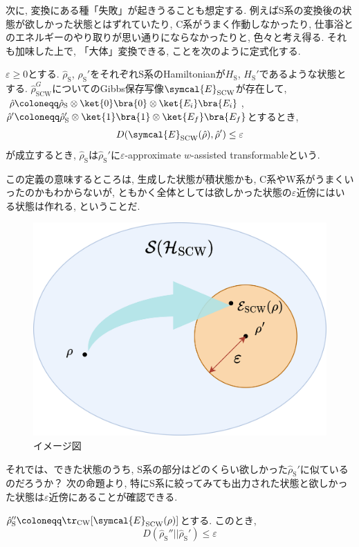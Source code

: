 


次に, 変換にある種「失敗」が起きうることも想定する. 
例えばS系の変換後の状態が欲しかった状態とはずれていたり, C系がうまく作動しなかったり, 仕事浴とのエネルギーのやり取りが思い通りにならなかったりと, 色々と考え得る. 
それも加味した上で, 「大体」変換できる, ことを次のように定式化する. 

\begin{mydfn}\label{dfn.approximate_single-shot_transformable}
  $\varepsilon \geq 0$とする. 
  $\hat{\rho}_{\text{S}}$, $\hat{\rho}_{\text{S}}'$をそれぞれS系のHamiltonianが$H_{\text{S}}$, $H_{\text{S}}'$であるような状態とする. 
  $\hat{\rho}_{\text{SCW}}^G$についてのGibbs保存写像$\symcal{E}_{\text{SCW}}$が存在して, $\hat{\rho}\coloneqq \hat{\rho}_{\text{S}}\otimes\ket{0}\bra{0}\otimes\ket{E_i}\bra{E_i}$, $\hat{\rho}'\coloneqq \hat{\rho}_{\text{S}}'\otimes\ket{1}\bra{1}\otimes\ket{E_f}\bra{E_f}$とするとき, 
  \begin{equation}
    D(\symcal{E}_{\text{SCW}}(\hat{\rho}), \hat{\rho}')\leq \varepsilon
  \end{equation}
  が成立するとき, $\hat{\rho}_\text{S}$は$\hat{\rho}_\text{S}'$に$\varepsilon$-approximate $w$-assisted transformableという. 
\end{mydfn}
この定義の意味するところは, 生成した状態が積状態かも, C系やW系がうまくいったのかもわからないが, ともかく全体としては欲しかった状態の$\varepsilon$近傍にはいる状態は作れる, ということだ. 

\begin{figure}[H]
  \centering
  \includegraphics[keepaspectratio, scale=0.03]{images/approximate.drawio.png}
  \caption{イメージ図}\label{fig.approximate_image}
\end{figure}
それでは、できた状態のうち, S系の部分はどのくらい欲しかった$\hat{\rho}_\text{S}'$に似ているのだろうか？
次の命題より, 特にS系に絞ってみても出力された状態と欲しかった状態は$\varepsilon$近傍にあることが確認できる. 
\begin{myprop}
  $\hat{\rho}_{\text{S}}''\coloneqq \tr_{\text{CW}}[\symcal{E}_{\text{SCW}}(\rho)]$とする. 
  このとき, 
  \begin{equation}
    D(\hat{\rho}_{\text{S}}''||\hat{\rho}_{\text{S}}')\leq \varepsilon
  \end{equation}
\end{myprop}


